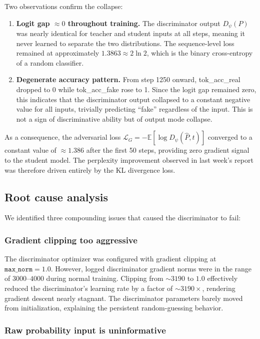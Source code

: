 \documentclass{article}
\begin{document}
Two observations confirm the collapse:
\begin{enumerate}
    \item \textbf{Logit gap $\approx 0$ throughout training.} The discriminator output $D_\psi(P)$ was nearly identical for teacher and student inputs at all steps, meaning it never learned to separate the two distributions. The sequence-level loss remained at approximately $1.3863 \approx 2\ln 2$, which is the binary cross-entropy of a random classifier.
    \item \textbf{Degenerate accuracy pattern.} From step 1250 onward, tok\_acc\_real dropped to 0 while tok\_acc\_fake rose to 1. Since the logit gap remained zero, this indicates that the discriminator output collapsed to a constant negative value for all inputs, trivially predicting ``fake'' regardless of the input. This is not a sign of discriminative ability but of output mode collapse.
\end{enumerate}

As a consequence, the adversarial loss $\mathcal{L}_G = -\mathbb{E}[\log D_\psi(\hat{P}, t)]$ converged to a constant value of $\approx 1.386$ after the first 50 steps, providing zero gradient signal to the student model. The perplexity improvement observed in last week's report was therefore driven entirely by the KL divergence loss.

\subsection{Root cause analysis}

We identified three compounding issues that caused the discriminator to fail:

\subsubsection{Gradient clipping too aggressive}

The discriminator optimizer was configured with gradient clipping at $\texttt{max\_norm} = 1.0$. However, logged discriminator gradient norms were in the range of $3000$--$4000$ during normal training. Clipping from $\sim 3190$ to $1.0$ effectively reduced the discriminator's learning rate by a factor of $\sim 3190\times$, rendering gradient descent nearly stagnant. The discriminator parameters barely moved from initialization, explaining the persistent random-guessing behavior.

\subsubsection{Raw probability input is uninformative}
\end{document}
